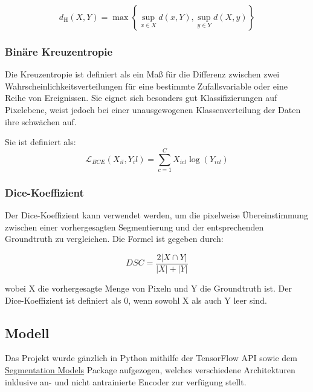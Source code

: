\begin{equation}
d_{\mathrm{H}}(X, Y)=\max \left\{\sup _{x \in X} d(x, Y), \sup _{y \in Y} d(X, y)\right\}
\end{equation}

\subsubsection{Binäre Kreuzentropie} \label{ssec:bce}

Die Kreuzentropie ist definiert als ein Maß für die Differenz zwischen zwei Wahrscheinlichkeitsverteilungen für eine bestimmte Zufallsvariable oder eine Reihe von Ereignissen. Sie eignet sich besonders gut Klassifizierungen auf Pixelebene, weist jedoch bei einer unausgewogenen Klassenverteilung der Daten ihre schwächen auf. \citep{Jadon_2020} 

Sie ist definiert als:
\begin{equation}
\mathcal{L}_{BCE}\left(X_{i l}, Y_{i} l\right)=\sum_{c=1}^{C} X_{i c l} \log \left(Y_{i c l}\right)
\end{equation}

\subsubsection{Dice-Koeffizient} \label{ssec:dc}

Der Dice-Koeffizient kann verwendet werden, um die pixelweise Übereinstimmung zwischen einer vorhergesagten Segmentierung und der entsprechenden Groundtruth zu vergleichen. Die Formel ist gegeben durch:

\begin{equation}
D S C=\frac{2|X \cap Y|}{|X|+|Y|}
\end{equation}

wobei X die vorhergesagte Menge von Pixeln und Y die Groundtruth ist. Der Dice-Koeffizient ist definiert als 0, wenn sowohl X als auch Y leer sind.

\subsection{Modell}

Das Projekt wurde gänzlich in Python mithilfe der TensorFlow API sowie dem
 \href{https://deepai.org/machine-learning-glossary-and-terms/relu}{Segmentation Models} \citep{Yakubovskiy:2019}
 Package aufgezogen, welches verschiedene Architekturen inklusive an- und nicht antrainierte Encoder zur verfügung stellt. 
 
